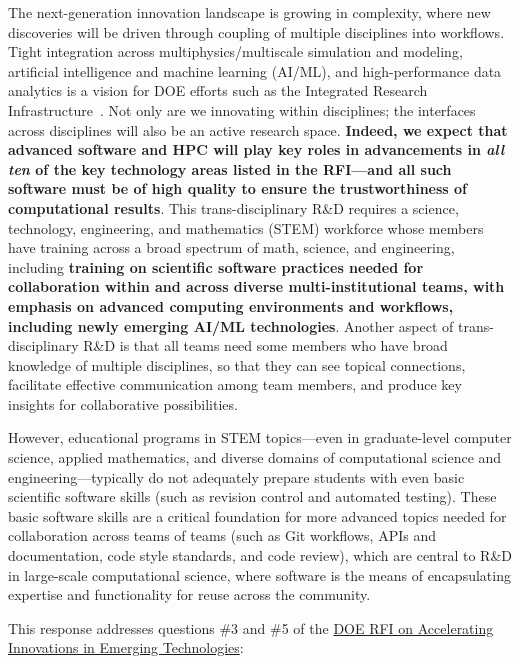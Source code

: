 The next-generation innovation landscape is growing in complexity, where new discoveries will be driven through coupling of multiple disciplines into workflows. Tight integration across multiphysics/multiscale simulation and modeling, artificial intelligence and machine learning (AI/ML), and high-performance data analytics is a vision for DOE efforts such as the Integrated Research Infrastructure~\cite{brown-ascac2021,ascr-iri-taskforce2021}. Not only are we innovating within disciplines; the interfaces across disciplines will also be an active research space.  
{\bf Indeed, we expect that advanced software and HPC will play key roles in advancements in \emph{all ten} of the key technology areas listed in the RFI---and all such software must be of high quality to ensure the trustworthiness of computational results}. 
This trans-disciplinary R\&D requires a science, technology, engineering, and mathematics (STEM) workforce whose members have training across a broad spectrum of math, science, and engineering, including {\bf training on scientific software practices needed for collaboration within and across diverse multi-institutional teams, with emphasis on advanced computing environments and workflows, including newly emerging AI/ML technologies}. Another aspect of trans-disciplinary R\&D is that all teams need some members who have broad knowledge of multiple disciplines, so that they can see topical connections, facilitate effective communication among team members, and produce key insights for collaborative possibilities.  

However, educational programs in STEM topics---even in graduate-level computer science, applied mathematics, and diverse domains of computational science and engineering---typically do not adequately prepare students with even basic scientific software skills (such as revision control and automated testing). These basic software skills are a critical foundation for more advanced topics needed for collaboration across teams of teams (such as Git workflows, APIs and documentation, code style standards, and code review), which are central to R\&D in large-scale computational science, where software is the means of encapsulating expertise and functionality for reuse across the community.  

This response addresses questions \#3 and \#5 of the
\href{https://www.federalregister.gov/documents/2022/11/08/2022-24250/accelerating-innovations-in-emerging-technologies}{DOE RFI on Accelerating Innovations in Emerging Technologies}: 

